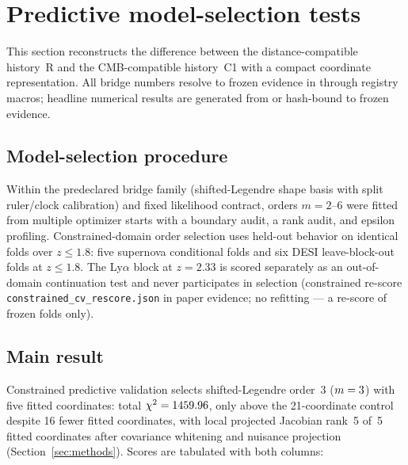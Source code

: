 \section{Predictive model-selection tests}
\label{sec:bridge}

This section reconstructs the difference between the
distance-compatible history~R and the CMB-compatible history~C1 with
a compact coordinate representation. All bridge numbers resolve to
frozen evidence in  through
registry macros; headline numerical results are generated from or
hash-bound to frozen evidence.

\subsection{Model-selection procedure}

Within the predeclared bridge family (shifted-Legendre shape basis
with split ruler/clock calibration) and fixed likelihood contract,
orders $m=2$--$6$ were fitted from multiple optimizer starts with a
boundary audit, a rank audit, and epsilon profiling. Constrained-domain
order selection uses held-out behavior on identical folds over
$z\le1.8$: five supernova conditional folds and six DESI
leave-block-out folds at $z\le1.8$. The Ly$\alpha$ block at $z=2.33$
is scored separately as an out-of-domain continuation test and never
participates in selection
(constrained re-score \texttt{constrained\_cv\_rescore.json} in paper
evidence;
no refitting — a re-score of frozen folds only).

\subsection{Main result}

Constrained predictive validation selects shifted-Legendre order~3
($m=3{}$) with five fitted coordinates: total
$\chi^{2}=1459.96{}$, only
\BridgeDeltaCtrl{} above the 21-coordinate control despite 16 fewer
fitted coordinates, with local projected Jacobian rank~5 of~5 fitted
coordinates after covariance whitening and nuisance projection
(Section~\ref{sec:methods}). Scores are tabulated with both columns:

\begin{table}[!htbp]
  \centering
  \caption{Constrained-domain held-out scores by order (selection
  column) with the Ly$\alpha$ continuation score alongside. The star
  marks the selected order under the predeclared smallest-$m$-within-2.0
  rule. Frozen folds, re-scored; no refitting.}
  \label{tab:constrained-cv}
  
\end{table}

